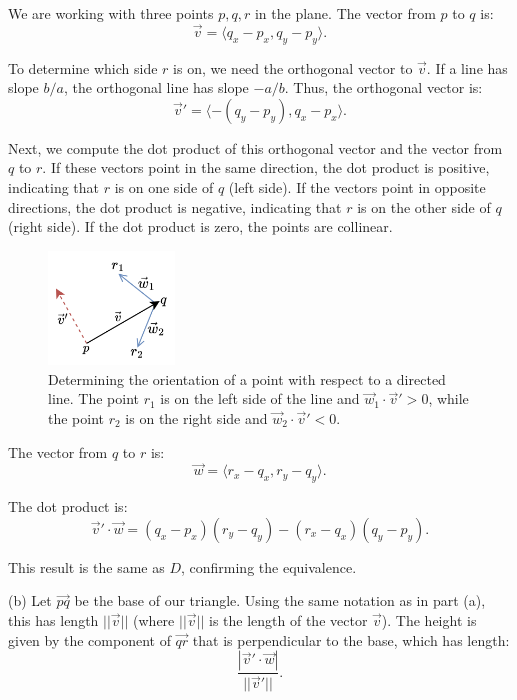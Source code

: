 \documentclass[12pt]{article}
\begin{document}
We are working with three points \( p, q, r \) in the plane. The vector from \( p \) to \( q \) is:
\[
\vec{v} = \langle q_x - p_x, q_y - p_y \rangle.
\]

To determine which side \( r \) is on, we need the orthogonal vector to \( \vec{v} \). If a line has slope \( b/a \), the orthogonal line has slope \( -a/b \). Thus, the orthogonal vector is:
\[
\vec{v}' = \langle -(q_y - p_y), q_x - p_x \rangle.
\]

Next, we compute the dot product of this orthogonal vector and the vector from \( q \) to \( r \). If these vectors point in the same direction, the dot product is positive, indicating that \( r \) is on one side of \( q \) (left side). If the vectors point in opposite directions, the dot product is negative, indicating that \( r \) is on the other side of \( q \) (right side). If the dot product is zero, the points are collinear.

\begin{figure}[H]
    \centering
    \includegraphics[width=0.3\textwidth]{img/Line_Orientation.png}
    \caption{Determining the orientation of a point with respect to a directed line. The point \( r_1 \) is on the left side of the line and \(\vec{w}_1 \cdot \vec{v}' > 0\), while the point \( r_2 \) is on the right side and \(\vec{w}_2 \cdot \vec{v}' < 0\).}
    \label{fig:line}
\end{figure}

The vector from \( q \) to \( r \) is:
\[
\vec{w} = \langle r_x - q_x, r_y - q_y \rangle.
\]

The dot product is:
\[
\vec{v}' \cdot \vec{w} = (q_x - p_x)(r_y - q_y) - (r_x - q_x)(q_y - p_y).
\]

This result is the same as \( D \), confirming the equivalence.

\vspace{0.5cm}

(b) Let \( \vec{pq} \) be the base of our triangle. Using the same notation as in part (a), this has length \( ||\vec{v}|| \) (where \( ||\vec{v}|| \) is the length of the vector \( \vec{v} \)). The height is given by the component of \( \vec{qr} \) that is perpendicular to the base, which has length:
\[
\frac{| \vec{v}' \cdot \vec{w} |}{||\vec{v}'||}.
\]
\end{document}
